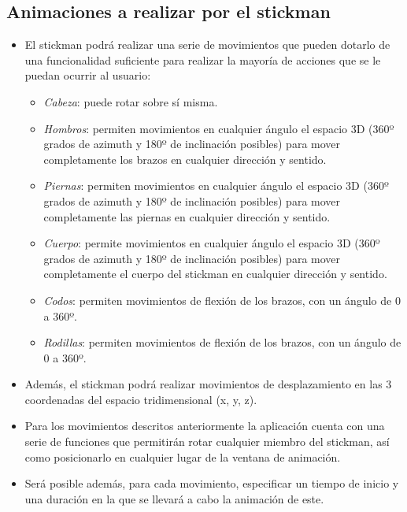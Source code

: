 \subsection{Animaciones a realizar por el stickman}

\begin{itemize}
\item El stickman podrá realizar una serie de movimientos que pueden dotarlo de una funcionalidad suficiente para realizar la mayoría de acciones que se le puedan ocurrir al usuario: \\

\begin{itemize}
         \item \textit{Cabeza}: puede rotar sobre sí misma.
         \item \textit{Hombros}: permiten movimientos en cualquier ángulo el espacio 3D (360º grados de azimuth y 180º de inclinación posibles) para mover completamente los brazos en cualquier dirección y sentido.
         \item \textit{Piernas}: permiten movimientos en cualquier ángulo el espacio 3D (360º grados de azimuth y 180º de inclinación posibles) para mover completamente las piernas en cualquier dirección y sentido.
         \item \textit{Cuerpo}: permite movimientos en cualquier ángulo el espacio 3D (360º grados de azimuth y 180º de inclinación posibles) para mover completamente el cuerpo del stickman en cualquier dirección y sentido.
         \item \textit{Codos}: permiten movimientos de flexión de los brazos, con un ángulo de 0 a 360º.
         \item \textit{Rodillas}: permiten movimientos de flexión de los brazos, con un ángulo de 0 a 360º.\\
\end{itemize}

\item Además, el stickman podrá realizar movimientos de desplazamiento en las 3 coordenadas del espacio tridimensional (x, y, z).

\item Para los movimientos descritos anteriormente la aplicación cuenta con una serie de funciones que permitirán rotar cualquier miembro del stickman, así como posicionarlo en cualquier lugar de la ventana de animación. 
\item Será posible además, para cada movimiento, especificar un tiempo de inicio y una duración en la que se llevará a cabo la animación de este. \\
\end{itemize}


